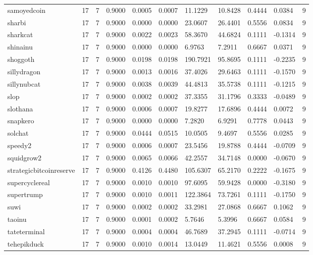 \begin{table}[htbp]
\begin{tabular}{lllllllllll}
samoyedcoin & 17 & 7 & 0.9000 & 0.0005 & 0.0007 & 11.1229 & 10.8428 & 0.4444 & 0.0384 & 9 \\
sharbi & 17 & 7 & 0.9000 & 0.0000 & 0.0000 & 23.0607 & 26.4401 & 0.5556 & 0.0834 & 9 \\
sharkcat & 17 & 7 & 0.9000 & 0.0022 & 0.0023 & 58.3670 & 44.6824 & 0.1111 & -0.1314 & 9 \\
shinainu & 17 & 7 & 0.9000 & 0.0000 & 0.0000 & 6.9763 & 7.2911 & 0.6667 & 0.0371 & 9 \\
shoggoth & 17 & 7 & 0.9000 & 0.0198 & 0.0198 & 190.7921 & 95.8695 & 0.1111 & -0.2235 & 9 \\
sillydragon & 17 & 7 & 0.9000 & 0.0013 & 0.0016 & 37.4026 & 29.6463 & 0.1111 & -0.1570 & 9 \\
sillynubcat & 17 & 7 & 0.9000 & 0.0038 & 0.0039 & 44.4813 & 35.5738 & 0.1111 & -0.1215 & 9 \\
slop & 17 & 7 & 0.9000 & 0.0002 & 0.0002 & 37.3355 & 31.1796 & 0.3333 & -0.0489 & 9 \\
slothana & 17 & 7 & 0.9000 & 0.0006 & 0.0007 & 19.8277 & 17.6896 & 0.4444 & 0.0072 & 9 \\
snapkero & 17 & 7 & 0.9000 & 0.0000 & 0.0000 & 7.2820 & 6.9291 & 0.7778 & 0.0443 & 9 \\
solchat & 17 & 7 & 0.9000 & 0.0444 & 0.0515 & 10.0505 & 9.4697 & 0.5556 & 0.0285 & 9 \\
speedy2 & 17 & 7 & 0.9000 & 0.0006 & 0.0007 & 23.5456 & 19.8788 & 0.4444 & -0.0709 & 9 \\
squidgrow2 & 17 & 7 & 0.9000 & 0.0065 & 0.0066 & 42.2557 & 34.7148 & 0.0000 & -0.0670 & 9 \\
strategicbitcoinreserve & 17 & 7 & 0.9000 & 0.4126 & 0.4480 & 105.6307 & 65.2170 & 0.2222 & -0.1675 & 9 \\
supercyclereal & 17 & 7 & 0.9000 & 0.0010 & 0.0010 & 97.6095 & 59.9428 & 0.0000 & -0.3180 & 9 \\
supertrump & 17 & 7 & 0.9000 & 0.0010 & 0.0011 & 122.3864 & 73.7261 & 0.1111 & -0.1750 & 9 \\
suwi & 17 & 7 & 0.9000 & 0.0002 & 0.0002 & 33.2981 & 27.0868 & 0.6667 & 0.1062 & 9 \\
taoinu & 17 & 7 & 0.9000 & 0.0001 & 0.0002 & 5.7646 & 5.3996 & 0.6667 & 0.0584 & 9 \\
tateterminal & 17 & 7 & 0.9000 & 0.0004 & 0.0004 & 46.7689 & 37.2945 & 0.1111 & -0.0714 & 9 \\
tehepikduck & 17 & 7 & 0.9000 & 0.0010 & 0.0014 & 13.0449 & 11.4621 & 0.5556 & 0.0008 & 9 \\

\end{tabular}
\end{table}
